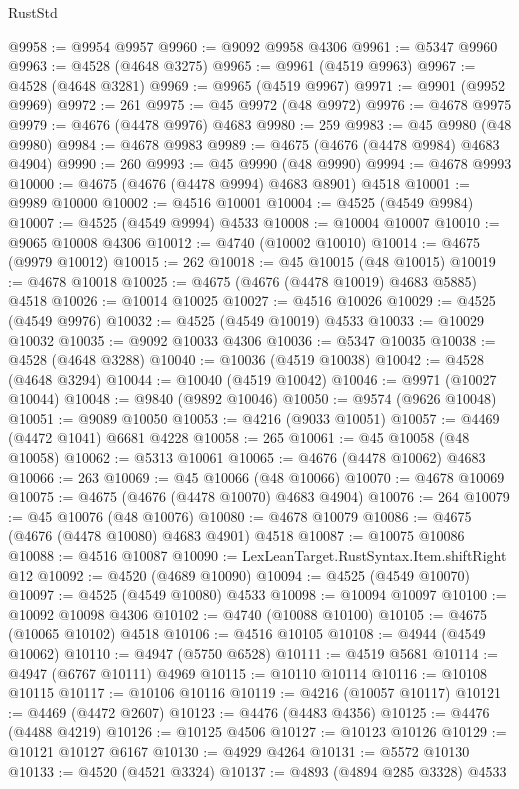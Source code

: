 \begin{lexlean}{RustStd}
\begin{coremodule}
{\begin{coremodule}
{{{{{{{{{{{{{{{{{{{{{{{{{{{{{{{{{{{{{{{{{{{{{{{{{{{{{{{{{{{{@9958 := @9954 @9957
@9960 := @9092 @9958 @4306
@9961 := @5347 @9960
@9963 := @4528 (@4648 @3275)
@9965 := @9961 (@4519 @9963)
@9967 := @4528 (@4648 @3281)
@9969 := @9965 (@4519 @9967)
@9971 := @9901 (@9952 @9969)
@9972 := 261
@9975 := @45 @9972 (@48 @9972)
@9976 := @4678 @9975
@9979 := @4676 (@4478 @9976) @4683
@9980 := 259
@9983 := @45 @9980 (@48 @9980)
@9984 := @4678 @9983
@9989 := @4675 (@4676 (@4478 @9984) @4683 @4904)
@9990 := 260
@9993 := @45 @9990 (@48 @9990)
@9994 := @4678 @9993
@10000 := @4675 (@4676 (@4478 @9994) @4683 @8901) @4518
@10001 := @9989 @10000
@10002 := @4516 @10001
@10004 := @4525 (@4549 @9984)
@10007 := @4525 (@4549 @9994) @4533
@10008 := @10004 @10007
@10010 := @9065 @10008 @4306
@10012 := @4740 (@10002 @10010)
@10014 := @4675 (@9979 @10012)
@10015 := 262
@10018 := @45 @10015 (@48 @10015)
@10019 := @4678 @10018
@10025 := @4675 (@4676 (@4478 @10019) @4683 @5885) @4518
@10026 := @10014 @10025
@10027 := @4516 @10026
@10029 := @4525 (@4549 @9976)
@10032 := @4525 (@4549 @10019) @4533
@10033 := @10029 @10032
@10035 := @9092 @10033 @4306
@10036 := @5347 @10035
@10038 := @4528 (@4648 @3288)
@10040 := @10036 (@4519 @10038)
@10042 := @4528 (@4648 @3294)
@10044 := @10040 (@4519 @10042)
@10046 := @9971 (@10027 @10044)
@10048 := @9840 (@9892 @10046)
@10050 := @9574 (@9626 @10048)
@10051 := @9089 @10050
@10053 := @4216 (@9033 @10051)
@10057 := @4469 (@4472 @1041) @6681 @4228
@10058 := 265
@10061 := @45 @10058 (@48 @10058)
@10062 := @5313 @10061
@10065 := @4676 (@4478 @10062) @4683
@10066 := 263
@10069 := @45 @10066 (@48 @10066)
@10070 := @4678 @10069
@10075 := @4675 (@4676 (@4478 @10070) @4683 @4904)
@10076 := 264
@10079 := @45 @10076 (@48 @10076)
@10080 := @4678 @10079
@10086 := @4675 (@4676 (@4478 @10080) @4683 @4901) @4518
@10087 := @10075 @10086
@10088 := @4516 @10087
@10090 := LexLeanTarget.RustSyntax.Item.shiftRight @12
@10092 := @4520 (@4689 @10090)
@10094 := @4525 (@4549 @10070)
@10097 := @4525 (@4549 @10080) @4533
@10098 := @10094 @10097
@10100 := @10092 @10098 @4306
@10102 := @4740 (@10088 @10100)
@10105 := @4675 (@10065 @10102) @4518
@10106 := @4516 @10105
@10108 := @4944 (@4549 @10062)
@10110 := @4947 (@5750 @6528)
@10111 := @4519 @5681
@10114 := @4947 (@6767 @10111) @4969
@10115 := @10110 @10114
@10116 := @10108 @10115
@10117 := @10106 @10116
@10119 := @4216 (@10057 @10117)
@10121 := @4469 (@4472 @2607)
@10123 := @4476 (@4483 @4356)
@10125 := @4476 (@4488 @4219)
@10126 := @10125 @4506
@10127 := @10123 @10126
@10129 := @10121 @10127 @6167
@10130 := @4929 @4264
@10131 := @5572 @10130
@10133 := @4520 (@4521 @3324)
@10137 := @4893 (@4894 @285 @3328) @4533
}}}}}}}}}}}}}}}}}}}}}}}}}}}}}}}}}}}}}}}}}}}}}}}}}}}}}}}}}}}}
\end{coremodule}}
\end{coremodule}
\end{lexlean}
